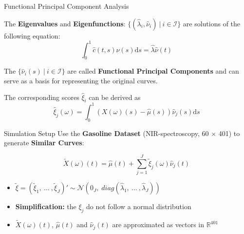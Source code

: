 \documentclass{beamer}
\begin{document}
	\begin{frame}{Functional Principal Component Analysis}\label{FPCA}
	
		The \textbf{Eigenvalues} and \textbf{Eigenfunctions}: $\{(\hat{\lambda}_i, \hat{\nu}_i) \: \vert \: i \in \mathcal{I}\}$  are solutions of the following equation:
		$$ \int_{0}^{1}\hat{c}(t,s)\hat{\nu}(s) \mathrm{d}s = \hat{\lambda} \hat{\nu}(t) $$
		\vspace{0.2cm}
		
		The $\{\hat{\nu}_i(s) \: \vert \: i \in \mathcal{I}\}$ are called \textbf{Functional Principal Components} and can serve as a basis for representing the original curves. 
		\vspace{0.2cm}
		
		The corresponding scores $\hat{\xi}_i$ can be derived as
		$$\hat{\xi}_j(\omega) = \int_{0}^{1} (X(\omega)(s) - \hat{\mu}(s)) \hat{\nu}_j(s) \mathrm{d}s$$
		
		\hyperlink{PCA}{}
	\end{frame}

	\begin{frame}{Simulation Setup}
		Use the \textbf{Gasoline Dataset} (NIR-spectroscopy, 60 $\times$ 401) to generate \textbf{Similar Curves}:
	
		$$\tilde{X}(\omega)(t) = \hat{\mu}(t) + \sum_{j = 1}^{J} \tilde{\xi}_j(\omega) \hat{\nu}_j(t)$$ 
		\vspace{0.2cm}
		
		\begin{itemize}
			\item $\tilde{\xi} = \left(\tilde{\xi}_{1},\: \dots \:, \tilde{\xi}_{J}\right)' \sim \mathcal{N}(0_J, \; diag(\hat{\lambda}_1,\: \dots\:, \hat{\lambda}_J))$
			\item \textbf{Simplification:} the $\xi_{j}$ do not follow a normal distribution
			\item $\tilde{X}(\omega)(t)$, $\hat{\mu}(t)$ and $\hat{\nu}_j(t)$ are approximated as vectors in $\mathbb{R}^{401}$
		\end{itemize}
		
	\end{frame}
	
\end{document}
